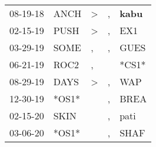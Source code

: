 \begin{supertabular}{p{0.07\textwidth}p{0.06\textwidth}p{0.02\textwidth}p{0.02\textwidth}p{0.06\textwidth}}
          08-19-18\textsuperscript{} &           ANCH\textsuperscript{} &     \textgreater &                , &  \textbf{kabu\textsuperscript{}} \\
          02-15-19\textsuperscript{} &           PUSH\textsuperscript{} &     \textgreater &                , &            EX1\textsuperscript{} \\
          03-29-19\textsuperscript{} &           SOME\textsuperscript{} &                , &                , &           GUES\textsuperscript{} \\
          06-21-19\textsuperscript{} &           ROC2\textsuperscript{} &                , &                  &                            *CS1* \\
          08-29-19\textsuperscript{} &           DAYS\textsuperscript{} &     \textgreater &                , &            WAP\textsuperscript{} \\
          12-30-19\textsuperscript{} &                            *OS1* &                  &                , &           BREA\textsuperscript{} \\
          02-15-20\textsuperscript{} &           SKIN\textsuperscript{} &                  &                , &           pati\textsuperscript{} \\
          03-06-20\textsuperscript{} &                            *OS1* &                  &                , &           SHAF\textsuperscript{} \\
\end{supertabular}
